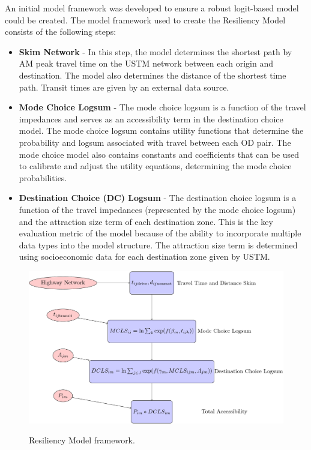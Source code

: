 An initial model framework was developed to ensure a robust logit-based model
could be created. The model framework used to create the Resiliency Model
consists of the following steps:

\begin{itemize}
	\item \textbf{Skim Network} - In this step, the model determines the shortest
  path by AM peak travel time on the USTM network between each origin and
  destination. The model also determines the distance of the shortest time
  path. Transit times are given by an external data source.
	\item \textbf{Mode Choice Logsum} - The mode choice logsum is a function of
  the travel impedances and serves as an accessibility term in the destination
  choice model. The mode choice logsum contains utility functions that
  determine the probability and logsum associated with travel between each OD
  pair. The mode choice model also contains constants and coefficients that can
  be used to calibrate and adjust the utility equations, determining the mode
  choice probabilities.
	\item \textbf{Destination Choice (DC) Logsum} - The destination choice logsum
  is a function of the travel impedances (represented by the mode choice logsum)
  and the attraction size term of each destination zone. This is the key
  evaluation metric of the model because of the ability to incorporate multiple
  data types into the model structure. The attraction size term is determined
  using socioeconomic data for each destination zone given by USTM.
	\end{itemize}

  \begin{figure}
    \centering
  {\includegraphics[width=0.75\linewidth]{figures/chapter3/framework.png}}
  \caption{Resiliency Model framework.}\label{fig:framework}

  \end{figure}

